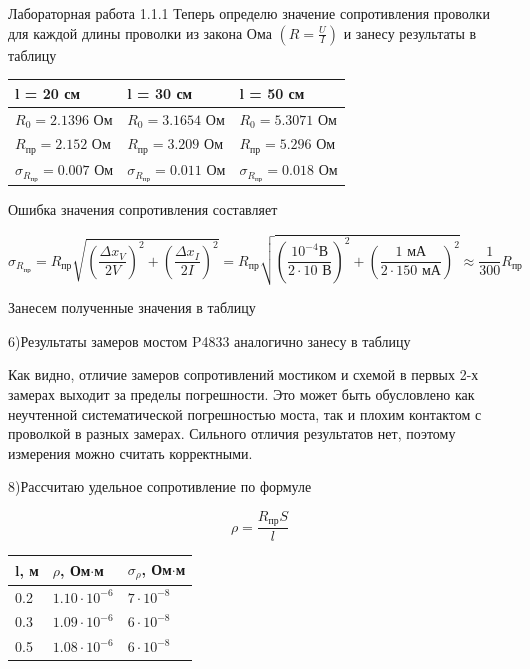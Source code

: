 \documentclass{astroedu-lab}
\begin{document}
\begin{problem}{\large Лабораторная работа 1.1.1}
Теперь определю значение сопротивления проволки для каждой длины проволки из закона Ома $\left( R = \frac{U}{I} \right)$ и занесу результаты в таблицу

\begin{center}
\begin{tabular}[t]{|l||l||l|}
\hline
l = 20 см & l = 30 см & l = 50 см \\
\hline
$R_0 = 2.1396 \text{ Ом}$ & $R_0 = 3.1654\text{ Ом}$ & $R_0 = 5.3071\text{ Ом}$\\
$R_{\text{пр}} = 2.152\text{ Ом}$ & $ R_{\text{пр}} = 3.209\text{ Ом}$ & $ R_{\text{пр}} = 5.296\text{ Ом}$ \\
$\sigma_{R_{\text{пр}}} = 0.007\text{ Ом} $ & $ \sigma_{R_{\text{пр}}} = 0.011\text{ Ом} $ & $\sigma_{R_{\text{пр}}} = 0.018\text{ Ом}$ \\
\hline


\end{tabular}
\end{center}

Ошибка значения сопротивления составляет

\begin{equation}
	\sigma_{R_{\text{пр}}} = R_\text{пр} \sqrt{\left( \frac{\Delta x_V}{2V} \right)^2 + \left( \frac{\Delta x_I}{2I} \right)^2} = R_\text{пр} \sqrt{\left( \frac{10^{-4}\text{В}}{2 \cdot 10 \text{ В}} \right)^2 + \left( \frac{1 \text{ мА}}{2 \cdot 150 \text{ мА}} \right)^2} \approx \frac{1}{300}  R_\text{пр}
\end{equation}

Занесем полученные значения в таблицу

6)Результаты замеров мостом P4833 аналогично занесу в таблицу

Как видно, отличие замеров сопротивлений мостиком и схемой в первых 2-х замерах выходит за пределы погрешности. Это может быть обусловлено как неучтенной систематической погрешностью моста, так и плохим контактом с проволкой в разных замерах. Сильного отличия результатов нет, поэтому измерения можно считать корректными.

8)Рассчитаю удельное сопротивление по формуле

\begin{equation}
	\rho = \frac{R_\text{пр} S}{l}
\end{equation}

\begin{center}
\begin{tabular}[t]{|l|l|l|}
\hline
l, м & $\rho$, Ом$\cdot$м & $\sigma_{\rho}$, Ом$\cdot$м \\
\hline
0.2 & $1.10 \cdot 10^{-6}$ & $7 \cdot 10^{-8}$ \\
0.3 & $1.09 \cdot 10^{-6}$ & $6 \cdot 10^{-8}$ \\
0.5 & $1.08 \cdot 10^{-6}$ & $6 \cdot 10^{-8}$ \\
\hline
\end{tabular}
\end{center}


\end{problem}
\end{document}
